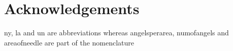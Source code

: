 \documentclass[12pt,a4paper,oneside]{article}
\begin{document}
\section*{Acknowledgements}
\tableofcontents
\newpage
\listoffigures
\newpage
\listoftables
\newpage
\printglossary[type=\acronymtype,title=Abbreviations]
\newpage
\printglossary[title=Nomenclature]

\newpage
{}
\setcounter{page}{1}

\newpage

\gls{ny}, \gls{la} and \gls{un} are abbreviations whereas
\gls{angelsperarea}, \gls{numofangels} and \gls{areaofneedle} are part of the
nomenclature

\printglossary[type=\acronymtype,title=Abbreviations]

\printglossary[title=Nomenclature]



{}

\end{document}
